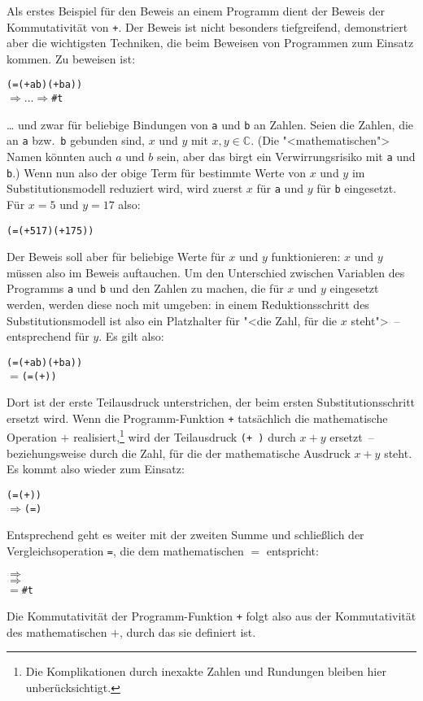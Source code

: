 Als erstes Beispiel für den Beweis an einem Programm dient der Beweis
der Kommutativität von \texttt{+}.  Der Beweis ist nicht besonders
tiefgreifend, demonstriert aber die wichtigsten Techniken, die beim
Beweisen von Programmen zum Einsatz kommen.  Zu beweisen ist:
%
\begin{alltt}
(= (+ a b) (+ b a))
\(\Longrightarrow\ldots\Longrightarrow\) \#t
\end{alltt}
%
\ldots{} und zwar für beliebige Bindungen von \texttt{a} und
\texttt{b} an Zahlen.  Seien die Zahlen, die an \texttt{a} bzw.\
\texttt{b} gebunden sind, $x$ und $y$ mit $x,y\in\mathbb{C}$.  (Die
"<mathematischen"> Namen könnten auch $a$ und $b$ sein, aber das birgt
ein Verwirrungsrisiko mit \texttt{a} und \texttt{b}.)  Wenn nun also
der obige Term für bestimmte Werte von $x$ und $y$ im
Substitutionsmodell reduziert wird, wird zuerst $x$ für \texttt{a} und
$y$ für \texttt{b} eingesetzt.  Für $x=5$ und $y=17$ also:
%
\begin{alltt}
(= (+ 5 17) (+ 17 5))
\end{alltt}
%
Der Beweis soll aber für beliebige Werte für $x$ und $y$
funktionieren: $x$ und $y$ müssen also im Beweis auftauchen.
Um den Unterschied zwischen Variablen des Programms \texttt{a} und
\texttt{b} und den Zahlen zu machen, die für $x$ und $y$ eingesetzt
werden, werden diese noch mit \valof{\_} umgeben: \valof{x} in
einem Reduktionsschritt des Substitutionsmodell ist also ein
Platzhalter für "<die Zahl, für die $x$ steht">~-- entsprechend für $y$.
Es gilt also:

\begin{alltt}
(= (+ a b) (+ b a))
\(=\) (=  (+  ))
\end{alltt}
%
Dort ist der erste Teilausdruck unterstrichen, der beim ersten
Substitutionsschritt ersetzt wird.  Wenn die Programm-Funktion
\texttt{+} tatsächlich die mathematische Operation $+$
realisiert,\footnote{Die Komplikationen durch inexakte Zahlen und
  Rundungen bleiben hier unberücksichtigt.}
wird der Teilausdruck \texttt{(+  )} durch $x+y$
ersetzt~-- beziehungsweise durch die Zahl, für die der mathematische
Ausdruck $x+y$ steht.  Es kommt also wieder \valof{\_} zum Einsatz:
%
\begin{alltt}
(=  (+  ))
\(\Longrightarrow\) (=  )
\end{alltt}
%
Entsprechend geht es weiter mit der zweiten Summe und schließlich der
Vergleichsoperation \texttt{=}, die dem mathematischen $=$ entspricht:
%
\begin{alltt}
\(\Longrightarrow\) 
\(\Longrightarrow\) 
\(=\) \#t
\end{alltt}
%
Die Kommutativität der Programm-Funktion \texttt{+} folgt also aus der
Kommutativität des mathematischen $+$, durch das sie definiert ist.

